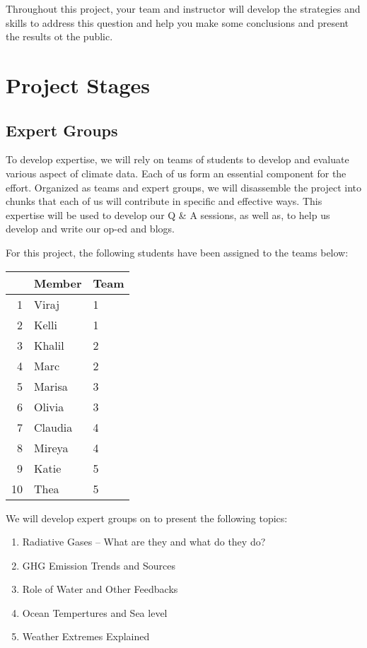 \documentclass{article}\usepackage[]{graphicx}\usepackage[]{color}
\begin{document}
Throughout this project, your team and instructor will develop the strategies and skills to address this question and help you make some conclusions and present the results ot the public.

\section{Project Stages}

\subsection{Expert Groups}

To develop expertise, we will rely on teams of students to develop and evaluate various aspect of climate data. Each of us form an essential component for the effort. Organized as teams and expert groups, we will disassemble the project into chunks that each of us will contribute in specific and effective ways. This expertise will be used to develop our Q \& A sessions, as well as, to help us develop and write our op-ed and blogs.

For this project, the following students have been assigned to the teams below:

\begin{table}[ht]
\centering
\begin{tabular}{rll}
  \hline
 & Member & Team \\ 
  \hline
1 & Viraj & 1 \\ 
  2 & Kelli & 1 \\ 
  3 & Khalil & 2 \\ 
  4 & Marc & 2 \\ 
  5 & Marisa & 3 \\ 
  6 & Olivia & 3 \\ 
  7 & Claudia & 4 \\ 
  8 & Mireya & 4 \\ 
  9 & Katie & 5 \\ 
  10 & Thea & 5 \\ 
   \hline
\end{tabular}
\end{table}


We will develop expert groups on to present the following topics:

\begin{enumerate}
  \item Radiative Gases -- What are they and what do they do?
  \item GHG Emission Trends and Sources
  \item Role of Water and Other Feedbacks
  \item Ocean Tempertures and Sea level
  \item Weather Extremes Explained
\end{enumerate}
\end{document}
